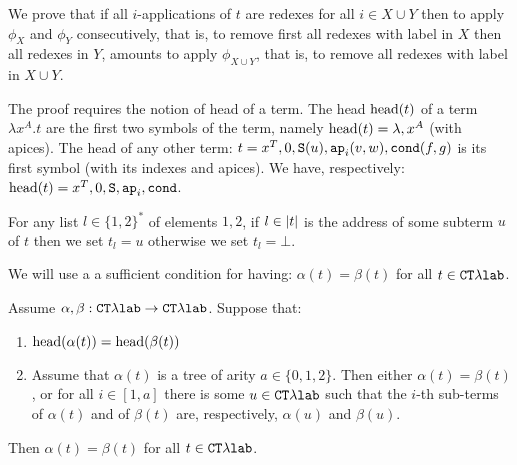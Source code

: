We prove that if all $i$-applications of $t$ are redexes for all $i \in X \cup Y$
then to apply $\phi_X$ and $\phi_Y$ consecutively, that is, to remove first all redexes with label in $X$
then all redexes in $Y$, amounts to apply $\phi_{X \cup Y}$,  that is, to remove 
all redexes with label in $X \cup Y$.

The proof requires the notion of head of a term. 
The head ${\rm head}(t)$  of a term
$\lambda x^A.t$ are the first two symbols of the term, namely ${\rm head}(t) = \lambda, x^A$ (with apices). 
The head of any other term:
$t = x^T,0,{\tt S}(u),{\tt ap}_i(v,w),{\tt cond}(f,g)$ is its first symbol (with its indexes and apices).
We have, respectively: 
${\rm head}(t) = x^T, 0, {\tt S}, {\tt ap}_i, {\tt cond}$. 

 For any list $l \in \{1,2\}^*$ of elements $1,2$, 
 if $l \in {|t|}$ is the address of some subterm $u$ of $t$ then we set $t_l = u$ 
 otherwise we set $t_l = \bot$. 

We will use a a sufficient condition for having: $\alpha(t) = \beta(t)$ for all $t \in { { {\tt CT}\lambda} \mbox{\tt lab}}$.

\begin{lemma}
\label{lemma-sufficient-condition}
Assume $\alpha, \beta: {{ {\tt CT}\lambda}\mbox{\tt lab}} \rightarrow { { {\tt CT}\lambda} \mbox{\tt lab}}$. 
Suppose that:

\begin{enumerate}
\item
${\rm head}(\alpha(t)) = {\rm head}(\beta(t))$ 
\item
Assume that $\alpha(t)$ is a tree of arity $a \in \{0,1,2\}$.
Then either $\alpha(t) = \beta(t)$, or 
for all $i \in [1,a]$ there is some $u \in { { {\tt CT}\lambda} \mbox{\tt lab}}$ such that the $i$-th sub-terms of 
 $\alpha(t)$ and of $\beta(t)$ are, respectively, $\alpha(u)$ and $\beta(u)$.
\end{enumerate}

Then $\alpha(t) = \beta(t)$ for all $t \in { { {\tt CT}\lambda} \mbox{\tt lab}}$.
\end{lemma}



